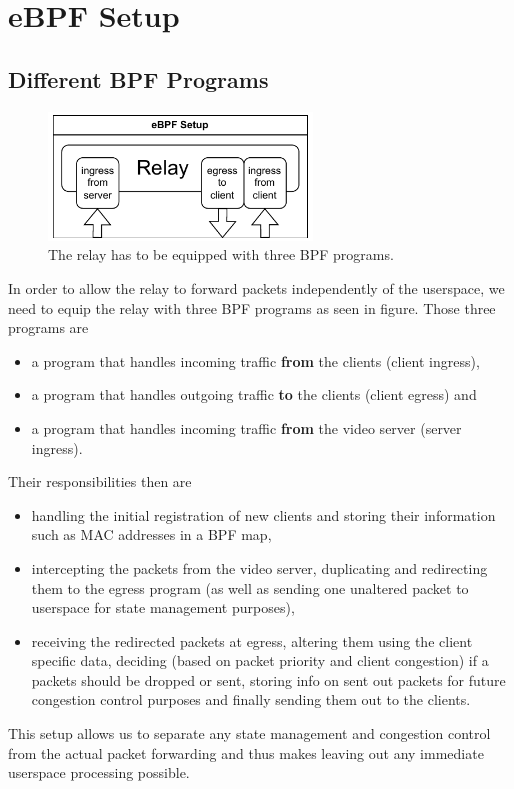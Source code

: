 \section{eBPF Setup}\label{sec:ebpf_setup}
\subsection{Different BPF Programs}
\begin{figure}[htbp]
    \centering
    \includegraphics[width=7cm]{figures/03_fast_relays/ebpf-setup.drawio.pdf}
    \caption[Types of eBPF programs at relay]{The relay has to be equipped with three BPF programs.}\label{fig:ebpf-programs}
\end{figure}

In order to allow the relay to forward packets independently of the userspace, we
need to equip the relay with three BPF programs as seen in figure.
Those three programs are 
\begin{itemize}
    \item a program that handles incoming traffic \textbf{from} the clients (client ingress),
    \item a program that handles outgoing traffic \textbf{to} the clients (client egress) and
    \item a program that handles incoming traffic \textbf{from} the video server (server ingress).
\end{itemize}
Their responsibilities then are
\begin{itemize}
    \item handling the initial registration of new clients and storing their information such as
    MAC addresses in a BPF map,
    \item intercepting the packets from the video server, duplicating and redirecting them to 
    the egress program (as well as sending one unaltered packet to userspace for state
    management purposes),
    \item receiving the redirected packets at egress, altering them using the client specific
    data, deciding (based on packet priority and client congestion) if a packets should be dropped 
    or sent, storing info on sent out packets for future congestion control purposes and finally sending 
    them out to the clients.
\end{itemize}
This setup allows us to separate any state management and congestion control from the actual
packet forwarding and thus makes leaving out any immediate userspace processing possible.

